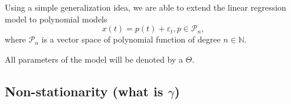 
 Using a simple generalization idea, we are able to extend the linear regression model to polynomial models
 \begin{displaymath}
  x(t) = p(t) + \varepsilon_t, p \in \mathcal{P}_n,
 \end{displaymath}
 where $\mathcal{P}_n$ is a vector space of polynomial function of degree $n \in \mathbb{N}$.

 All parameters of the model will be denoted by a $\Theta$.


 \subsection{Non-stationarity (what is $\gamma$)}


